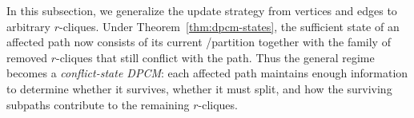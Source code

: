 

In this subsection, we generalize the update strategy from vertices and edges to arbitrary $r$-cliques.
%
Under Theorem~\ref{thm:dpcm-states}, the sufficient state of an affected path now consists of its current \hold/\pivot partition together with the family of removed $r$-cliques that still conflict with the path.
%
Thus the general regime becomes a \emph{conflict-state DPCM}: each affected path maintains enough information to determine whether it survives, whether it must split, and how the surviving subpaths contribute to the remaining $r$-cliques.











